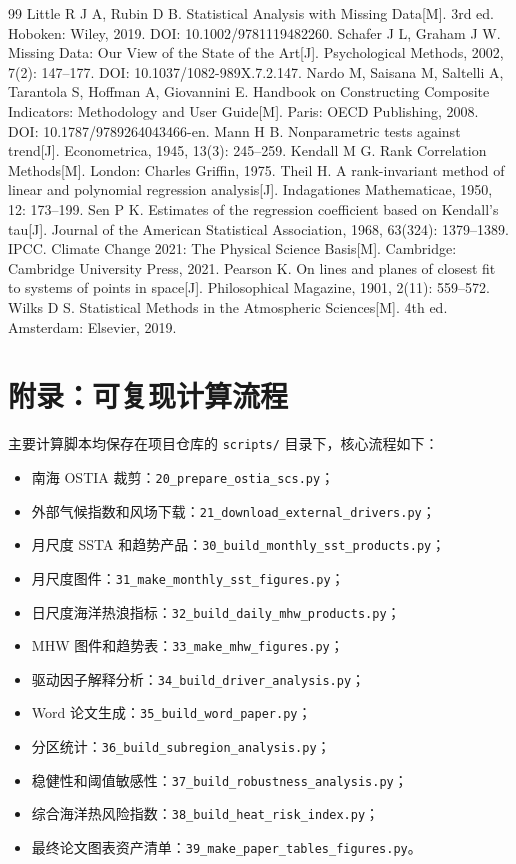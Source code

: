 \documentclass[UTF8,a4paper,zihao=-4,fontset=fandol]{ctexart}
\begin{document}
\begin{thebibliography}{99}
 Little R J A, Rubin D B. Statistical Analysis with Missing Data[M]. 3rd ed. Hoboken: Wiley, 2019. DOI: 10.1002/9781119482260.
 Schafer J L, Graham J W. Missing Data: Our View of the State of the Art[J]. Psychological Methods, 2002, 7(2): 147--177. DOI: 10.1037/1082-989X.7.2.147.
 Nardo M, Saisana M, Saltelli A, Tarantola S, Hoffman A, Giovannini E. Handbook on Constructing Composite Indicators: Methodology and User Guide[M]. Paris: OECD Publishing, 2008. DOI: 10.1787/9789264043466-en.
 Mann H B. Nonparametric tests against trend[J]. Econometrica, 1945, 13(3): 245--259.
 Kendall M G. Rank Correlation Methods[M]. London: Charles Griffin, 1975.
 Theil H. A rank-invariant method of linear and polynomial regression analysis[J]. Indagationes Mathematicae, 1950, 12: 173--199.
 Sen P K. Estimates of the regression coefficient based on Kendall's tau[J]. Journal of the American Statistical Association, 1968, 63(324): 1379--1389.
 IPCC. Climate Change 2021: The Physical Science Basis[M]. Cambridge: Cambridge University Press, 2021.
 Pearson K. On lines and planes of closest fit to systems of points in space[J]. Philosophical Magazine, 1901, 2(11): 559--572.
 Wilks D S. Statistical Methods in the Atmospheric Sciences[M]. 4th ed. Amsterdam: Elsevier, 2019.
\end{thebibliography}

\appendix
\section{附录：可复现计算流程}
主要计算脚本均保存在项目仓库的 \texttt{scripts/} 目录下，核心流程如下：
\begin{itemize}
  \item 南海 OSTIA 裁剪：\texttt{20\_prepare\_ostia\_scs.py}；
  \item 外部气候指数和风场下载：\texttt{21\_download\_external\_drivers.py}；
  \item 月尺度 SSTA 和趋势产品：\texttt{30\_build\_monthly\_sst\_products.py}；
  \item 月尺度图件：\texttt{31\_make\_monthly\_sst\_figures.py}；
  \item 日尺度海洋热浪指标：\texttt{32\_build\_daily\_mhw\_products.py}；
  \item MHW 图件和趋势表：\texttt{33\_make\_mhw\_figures.py}；
  \item 驱动因子解释分析：\texttt{34\_build\_driver\_analysis.py}；
  \item Word 论文生成：\texttt{35\_build\_word\_paper.py}；
  \item 分区统计：\texttt{36\_build\_subregion\_analysis.py}；
  \item 稳健性和阈值敏感性：\texttt{37\_build\_robustness\_analysis.py}；
  \item 综合海洋热风险指数：\texttt{38\_build\_heat\_risk\_index.py}；
  \item 最终论文图表资产清单：\texttt{39\_make\_paper\_tables\_figures.py}。
\end{itemize}
\end{document}
